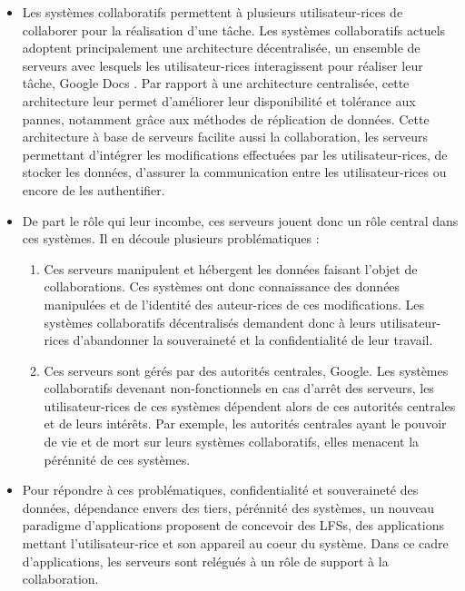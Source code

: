 \begin{itemize}
    \item Les systèmes collaboratifs permettent à plusieurs utilisateur-rices de collaborer pour la réalisation d'une tâche.
        Les systèmes collaboratifs actuels adoptent principalement une architecture décentralisée, \ie un ensemble de serveurs avec lesquels les utilisateur-rices interagissent pour réaliser leur tâche, \eg Google Docs \cite{gdocs}.
        Par rapport à une architecture centralisée, cette architecture leur permet d'améliorer leur disponibilité et tolérance aux pannes, notamment grâce aux méthodes de réplication de données.
        Cette architecture à base de serveurs facilite aussi la collaboration, les serveurs permettant d'intégrer les modifications effectuées par les utilisateur-rices, de stocker les données, d'assurer la communication entre les utilisateur-rices ou encore de les authentifier.
    \item De part le rôle qui leur incombe, ces serveurs jouent donc un rôle central dans ces systèmes.
        Il en découle plusieurs problématiques :
        \begin{enumerate}
            \item Ces serveurs manipulent et hébergent les données faisant l'objet de collaborations.
                Ces systèmes ont donc connaissance des données manipulées et de l'identité des auteur-rices de ces modifications.
                Les systèmes collaboratifs décentralisés demandent donc à leurs utilisateur-rices d'abandonner la souveraineté et la confidentialité de leur travail.
            \item Ces serveurs sont gérés par des autorités centrales, \eg Google.
                Les systèmes collaboratifs devenant non-fonctionnels en cas d'arrêt des serveurs, les utilisateur-rices de ces systèmes dépendent alors de ces autorités centrales et de leurs intérêts.
                Par exemple, les autorités centrales ayant le pouvoir de vie et de mort sur leurs systèmes collaboratifs, elles menacent la pérénnité de ces systèmes.
        \end{enumerate}
    \item Pour répondre à ces problématiques, \ie confidentialité et souveraineté des données, dépendance envers des tiers, pérénnité des systèmes, un nouveau paradigme d'applications proposent de concevoir des \acp{LFS}, \ie des applications mettant l'utilisateur-rice et son appareil au coeur du système.
        Dans ce cadre d'applications, les serveurs sont relégués à un rôle de support à la collaboration.

\end{itemize}
